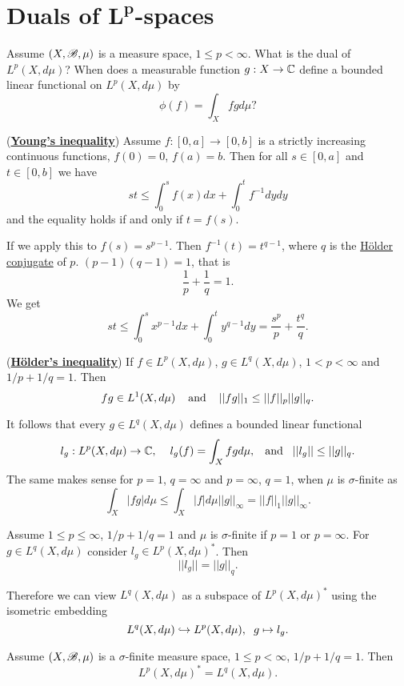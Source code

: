 

\section{Duals of $\mathbf{L^p}$-spaces}
Assume $(X,\mathscr{B},\mu)$ is a measure space, $1\leq p<\infty$. What is the dual of 
$L^p(X,d\mu)$? When does a measurable function $g:X\rightarrow \mathbb{C}$ define a bounded linear functional on $L^p(X,d\mu)$ by 
$$\phi(f)=\int_X fgd\mu?$$

\begin{theorem}(\underline{\textbf{Young's inequality}})
    Assume $f:[0,a]\rightarrow [0,b]$ is a strictly increasing continuous functions, $f(0)=0$, $f(a)=b$. Then for all $s\in[0,a]$ and $t\in[0,b]$
    we have $$st\leq \int_0^s f(x)dx + \int_0^t f^{-1}dy dy$$
    and the equality holds if and only if $t=f(s)$.
    
\end{theorem}
If we apply this to $f(s)=s^{p-1}$. Then $f^{-1}(t)=t^{q-1}$, where $q$ is the \underline{Hölder conjugate} of $p$. $(p-1)(q-1)=1$, that is $$\frac{1}{p}+\frac{1}{q}=1.$$
We get $$st \leq \int_0^s x^{p-1}dx + \int_0^t y^{q-1}dy = \frac{s^p}{p}+\frac{t^q}{q}.$$
\begin{theorem}(\underline{\textbf{Hölder's inequality}})
    If $f\in L^p(X,d\mu)$, $g\in L^q(X,d\mu)$, $1<p<\infty$ and $1/p + 1/q = 1$. Then 
    $$fg \in L^1(X,d\mu)\hspace{4mm}\text{and}\hspace{4mm} ||fg||_1 \leq ||f||_p||g||_q.$$
\end{theorem}


It follows that every $g\in L^q(X,d\mu)$ defines a bounded linear functional 
$$l_g:L^p(X,d\mu)\rightarrow \mathbb{C},\hspace{4mm} l_g(f) = \int_X fg d\mu,\hspace*{3mm}\text{and}\hspace{3mm} ||l_g||\leq ||g||_q.$$
The same makes sense for $p=1$, $q=\infty$ and $p=\infty$, $q=1$, when $\mu$ is $\sigma$-finite as 
$$\int_X|fg|d\mu\leq \int_X|f|d\mu ||g||_\infty = ||f||_1||g||_\infty.$$

\begin{lemma}
    Assume $1\leq p\leq\infty$, $1/p + 1/q = 1$ and $\mu$ is $\sigma$-finite if $p=1$ or $p=\infty$. For $g\in L^q(X,d\mu)$ consider $l_g\in L^p(X,d\mu)^*$. Then 
    $$||l_g|| = ||g||_q.$$
\end{lemma}


Therefore we can view $L^q(X,d\mu)$ as a subspace of $L^p(X,d\mu)^*$ using the isometric embedding
$$L^q(X,d\mu)\hookrightarrow L^p(X,d\mu),\hspace{2mm}g\mapsto l_g.$$ 
\begin{theorem}
    Assume $(X,\mathscr{B},\mu)$ is a $\sigma$-finite measure space, $1\leq p<\infty$, $1/p+1/q=1$. Then 
    $$L^p(X,d\mu)^* = L^q(X,d\mu).$$
\end{theorem}

